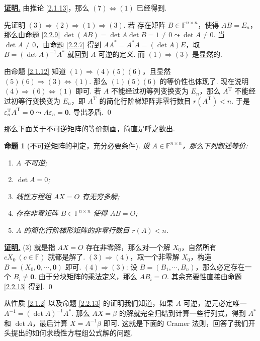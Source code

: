 \documentclass[10pt,openany]{article}
\theoremstyle{thmstyle} %
\theoremstyle{defstyle} %
\theoremstyle{prostyle} %
\newtheorem{proposition}[theorem]{命题}
\theoremstyle{exastyle}
\theoremstyle{remstyle}
\renewenvironment{proof}[1][证明]{\par\underline{\textbf{#1.}} \;\fangsong}{\qed\par}
\newcommand{\T}{^{\text{T}}}
\newcommand{\F}{\mathbb{F}}
\newcommand{\n}{^{n \times n}}
\begin{document}
\begin{proof}
	由推论 \ref{2.1.13}，那么 \( (7) \Leftrightarrow (1) \) 已经得到.
	 
	先证明 \( (3) \Rightarrow (2) \Rightarrow (1) \Rightarrow (3) \). 若 存在矩阵 \( B \in \F\n \)，使得 \( AB=E_n \)，那么由命题 \ref{2.2.9} \( \det(AB)=\det A \det B=1 \neq 0 \leadsto \det A \neq 0 \). 当 \( \det A \neq 0 \)，由命题 \ref{2.2.7} 得到 \( AA^*=A^*A=(\det A) E \)，取 \( B=(\det A)^{-1}A^* \) 就回到 \( A \) 可逆的定义. 而 \( (1) \Rightarrow (3) \) 是显然的.
	
	由命题 \ref{2.1.12} 知道 \( (1)  \Rightarrow (4)(5)(6) \)，且显然 \( (5)(6) \Rightarrow (3) \Leftrightarrow (1) \). 那么 \( (1)(5)(6) \) 的等价性也体现了. 现在说明 \( (4) \Rightarrow (6) \Leftrightarrow (1) \) 即可. 若 \( A \) 不能经过初等列变换变为 \( E_n \)，那么 \( A\T \) 不能经过初等行变换变为 \( E_n \)，即 \( A\T \) 的简化行阶梯矩阵非零行数目 \( r(A\T) <n \). 于是 \( \varepsilon_n\T A\T=\bm{0} \leadsto A\varepsilon_n=\bm{0} \). 导出矛盾.
\end{proof}

那么下面关于不可逆矩阵的等价刻画，简直是呼之欲出.

\begin{proposition}[不可逆矩阵的判定，充分必要条件]
	设 \( A \in \F\n \)，那么下列叙述等价:
	\begin{enumerate}[(1)]
		\item \( A \) 不可逆;
		\item \( \det A = 0 \);
		\item 线性方程组 \( AX=O \) 有无穷多解;
		\item 存在非零矩阵 \( B \in \F\n \) 使得 \( AB=O \);
		\item \( A \) 的简化行阶梯形矩阵的非零行数目 \( r(A)<n \).
	\end{enumerate}
	\label{2.2.14}
\end{proposition}

\begin{proof}
	(3) 就是指 \( AX=O \) 存在非零解，那么对一个解 \( X_0 \)，自然所有 \( cX_0 \ (c \in \F) \) 就都是解了. \( (3) \Rightarrow (4) \)，取一个非零解 \( X_0 \)，构造 \( B=(X_0,\bm{0},\cdots,\bm{0}) \) 即可. \( (4) \Rightarrow (3) \): 设 \( B=(B_1,\cdots,B_n) \)，那么必定存在一个 \( B_i \neq \bm{0} \). 由于分块矩阵的乘法定义，那么 \( AB_i=O \). 其余充要性直接由命题 \ref{2.2.13} 得到.
\end{proof}

从性质 \ref{2.1.2} 以及命题 \ref{2.2.13} 的证明我们知道，如果 \( A \) 可逆，逆元必定唯一 \( A^{-1}=(\det A)^{-1} A^* \). 那么 \( AX=\beta \) 的解就完全归结到计算一些行列式，得到 \( A^* \) 和 \( \det A \)，最后计算 \( X=A^{-1}\beta \) 即可. 这就是下面的 Cramer 法则，回答了我们开头提出的如何求线性方程组公式解的问题.
\end{document}
